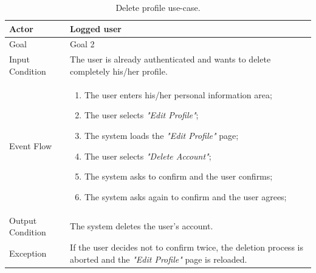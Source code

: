 \begin{table}[H]
\begin{center}
\begin{tabular}{p{} | p{}}
\hline
Actor & Logged user\\
\hline
Goal & Goal 2\\
\hline
Input Condition & The user is already authenticated and wants to delete completely his/her profile.\\
\hline
Event Flow & 
\begin{enumerate}
\item The user enters his/her personal information area;
\item The user selects \emph{"Edit Profile"};
\item The system loads the \emph{"Edit Profile"} page;
\item The user selects \emph{"Delete Account"};
\item The system asks to confirm and the user confirms;
\item The system asks again to confirm and the user agrees;
\end{enumerate} \\
\hline
Output Condition & The system deletes the user's account.\\
\hline
Exception & If the user decides not to confirm twice, the deletion process is aborted and the \emph{"Edit Profile"} page is reloaded.\\
\hline
\end{tabular}
\end{center}
\caption{Delete profile use-case.}
\label{delete_profile_uc}
\end{table}